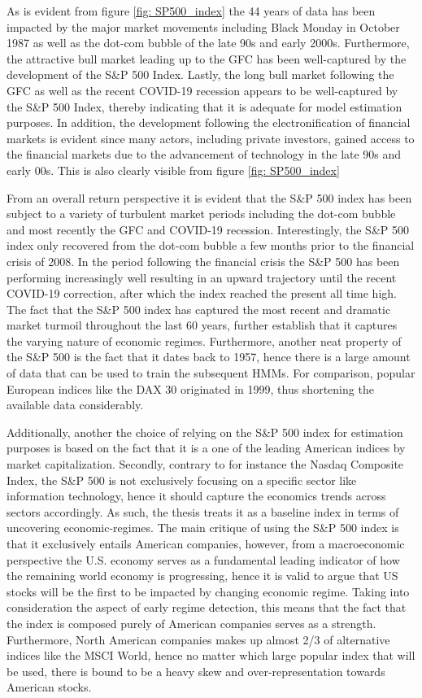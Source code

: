 As is evident from figure \ref{fig: SP500_index} the 44 years of data has been impacted by the major market movements including Black Monday in October 1987 as well as the dot-com bubble of the late 90s and early 2000s. Furthermore, the attractive bull market leading up to the GFC has been well-captured by the development of the S\&P 500 Index. Lastly, the long bull market following the GFC as well as the recent COVID-19 recession appears to be well-captured by the S\&P 500 Index, thereby indicating that it is adequate for model estimation purposes. In addition, the development following the electronification of financial markets is evident since many actors, including private investors, gained access to the financial markets due to the advancement of technology in the late 90s and early 00s. This is also clearly visible from figure \ref{fig: SP500_index}


From an overall return perspective it is evident that the S\&P 500 index has been subject to a variety of turbulent market periods including the dot-com bubble and most recently the GFC and COVID-19 recession. Interestingly, the S\&P 500 index only recovered from the dot-com bubble a few months prior to the financial crisis of 2008. In the period following the financial crisis the S\&P 500 has been performing increasingly well resulting in an upward trajectory until the recent COVID-19 correction, after which the index reached the present all time high. The fact that the S\&P 500 index has captured the most recent and dramatic market turmoil throughout the last 60 years, further establish that it captures the varying nature of economic regimes. Furthermore, another neat property of the S\&P 500 is the fact that it dates back to 1957, hence there is a large amount of data that can be used to train the subsequent HMMs. For comparison, popular European indices like the DAX 30 originated in 1999, thus shortening the available data considerably.

Additionally, another the choice of relying on the S\&P 500 index for estimation purposes is based on the fact that it is a one of the leading American indices by market capitalization. Secondly, contrary to for instance the Nasdaq Composite Index, the S\&P 500 is not exclusively focusing on a specific sector like information technology, hence it should capture the economics trends across sectors accordingly. As such, the thesis treats it as a baseline index in terms of uncovering economic-regimes. The main critique of using the S\&P 500 index is that it exclusively entails American companies, however, from a macroeconomic perspective the U.S. economy serves as a fundamental leading indicator of how the remaining world economy is progressing, hence it is valid to argue that US stocks will be the first to be impacted by changing economic regime. Taking into consideration the aspect of early regime detection, this means that the fact that the index is composed purely of American companies serves as a strength. Furthermore, North American companies makes up almost 2/3 of alternative indices like the MSCI World, hence no matter which large popular index that will be used, there is bound to be a heavy skew and over-representation towards American stocks.

